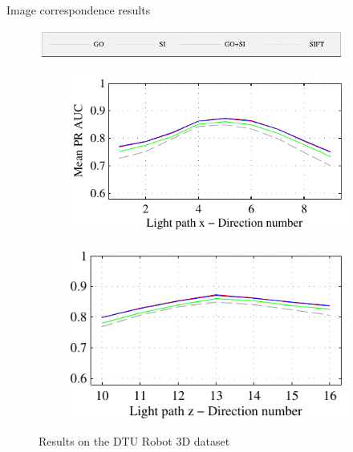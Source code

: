 \documentclass[14pt,t]{beamer}
\begin{document}
\begin{frame}{Image correspondence results}
\begin{figure}
	\hspace{0.6cm}\includegraphics[width=0.9\textwidth]{img/dtuResults_opponent_legend_cropped.pdf} \\
	\begin{subfigure}[t]{0.5\textwidth}
		\includegraphics[width=\textwidth]{img/dtuResultsPR_opponent_5.pdf}
	\end{subfigure}
	\begin{subfigure}[t]{0.45\textwidth}
		\includegraphics[width=\textwidth]{img/dtuResultsPR_opponent_6.pdf}
	\end{subfigure}
	\caption{Results on the DTU Robot 3D dataset}
\end{figure}
\end{frame}
%
\end{document}
